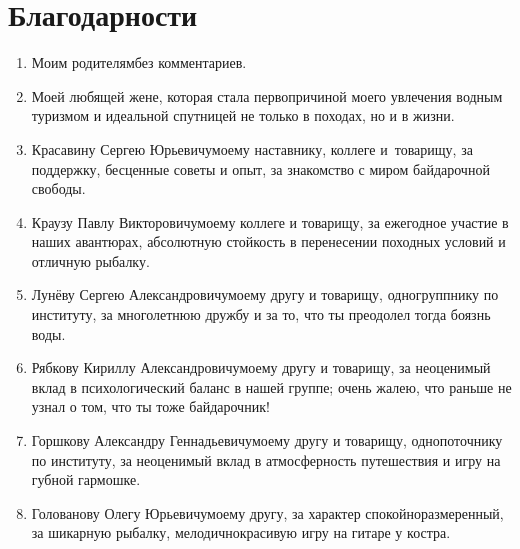 \newpage
{
\thispagestyle{empty}
\section*{Благодарности}

\begin{enumerate}
\item Моим родителям\mdash без комментариев.
%
\item Моей любящей жене, которая стала первопричиной моего увлечения водным туризмом и идеальной спутницей не только в походах, но и в жизни.
%
\item Красавину\: Сергею\: Юрьевичу\mdash моему наставнику, коллеге и~товарищу, за поддержку, бесценные советы и опыт, за знакомство с миром байдарочной свободы.
%
\item Краузу\: Павлу\: Викторовичу\mdash моему коллеге и товарищу, за ежегодное участие в наших авантюрах, абсолютную стойкость в перенесении походных условий и отличную рыбалку.
%
\item Лунёву\: Сергею\: Александровичу\mdash моему другу и товарищу, одногруппнику по институту, за многолетнюю дружбу и за то, что ты преодолел тогда боязнь воды.
%
\item Рябкову\: Кириллу\: Александровичу\mdash моему другу и товарищу, за неоценимый вклад в психологический баланс в нашей группе; очень жалею, что раньше не узнал о том, что ты тоже байдарочник!
%
\item Горшкову\: Александру\: Геннадьевичу\mdash моему другу и товарищу, однопоточнику по институту, за неоценимый вклад в атмосферность путешествия и игру на губной гармошке.
%
\item Голованову\: Олегу\: Юрьевичу\mdash моему другу, за характер спокойно\sdash размеренный, за шикарную рыбалку, мелодично\sdash красивую игру на гитаре у костра.

\end{enumerate}
}
